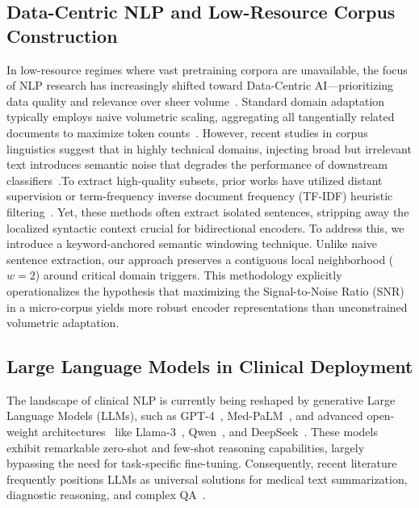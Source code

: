 \documentclass[a4paper,fleqn]{cas-dc}
\begin{document}
\subsection{Data-Centric NLP and Low-Resource Corpus Construction}
In low-resource regimes where vast pretraining corpora are unavailable, the focus of NLP research has increasingly shifted toward Data-Centric AI—prioritizing data quality and relevance over sheer volume~\cite{zha2025data}. Standard domain adaptation typically employs naive volumetric scaling, aggregating all tangentially related documents to maximize token counts~\cite{yao2024readme}. However, recent studies in corpus linguistics suggest that in highly technical domains, injecting broad but irrelevant text introduces semantic noise that degrades the performance of downstream classifiers~\cite{zhu2024towards}.To extract high-quality subsets, prior works have utilized distant supervision or term-frequency inverse document frequency (TF-IDF) heuristic filtering~\cite{gavrilescu2025techniques}. Yet, these methods often extract isolated sentences, stripping away the localized syntactic context crucial for bidirectional encoders. To address this, we introduce a keyword-anchored semantic windowing technique. Unlike naive sentence extraction, our approach preserves a contiguous local neighborhood ($w=2$) around critical domain triggers. This methodology explicitly operationalizes the hypothesis that maximizing the Signal-to-Noise Ratio (SNR) in a micro-corpus yields more robust encoder representations than unconstrained volumetric adaptation.

\subsection{Large Language Models in Clinical Deployment}
The landscape of clinical NLP is currently being reshaped by generative Large Language Models (LLMs), such as GPT-4~\cite{islam2025gpt}, Med-PaLM~\cite{singhal2023large}, and advanced open-weight architectures~\cite{wang2025evaluation} like Llama-3~\cite{grattafiori2024llama}, Qwen~\cite{bai2023qwen}, and DeepSeek~\cite{liu2024deepseek}. These models exhibit remarkable zero-shot and few-shot reasoning capabilities, largely bypassing the need for task-specific fine-tuning. Consequently, recent literature frequently positions LLMs as universal solutions for medical text summarization, diagnostic reasoning, and complex QA~\cite{thirunavukarasu2023large}.
\end{document}
